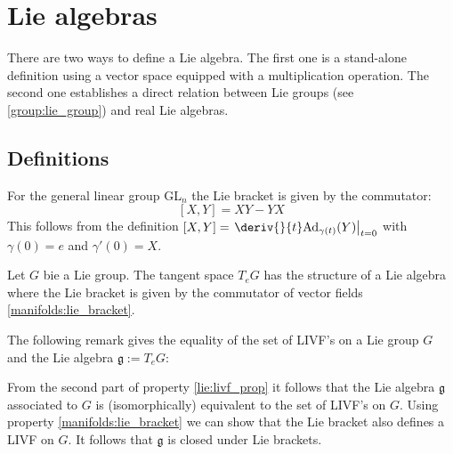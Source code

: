 \section{Lie algebras}
    	There are two ways to define a Lie algebra. The first one is a stand-alone definition using a vector space equipped with a multiplication operation. The second one establishes a direct relation between Lie groups (see \ref{group:lie_group}) and real Lie algebras.
        
\subsection{Definitions}
        \begin{remark}
        	For the general linear group GL$_n$ the Lie bracket is given by the commutator:
            \begin{equation}
            	\boxed{[X, Y] = XY - YX}
            \end{equation}
            This follows from the definition $[X, Y] = \left.\deriv{}{t}\text{Ad}_{\gamma(t)}(Y)\right|_{t=0}$ with $\gamma(0) = e$ and $\gamma'(0) = X$.
        \end{remark}
        
	\begin{definition}
		Let $G$ bie a Lie group. The tangent space $T_eG$ has the structure of a Lie algebra where the Lie bracket is given by the commutator of vector fields \ref{manifolds:lie_bracket}.
	\end{definition}
        
        The following remark gives the equality of the set of LIVF's on a Lie group $G$ and the Lie algebra $\mathfrak{g} := T_eG$:
        \begin{remark}
        	From the second part of property \ref{lie:livf_prop} it follows that the Lie algebra $\mathfrak{g}$ associated to $G$ is (isomorphically) equivalent to the set of LIVF's on $G$. Using property \ref{manifolds:lie_bracket} we can show that the Lie bracket also defines a LIVF on $G$. It follows that $\mathfrak{g}$ is closed under Lie brackets.
        \end{remark}
        
